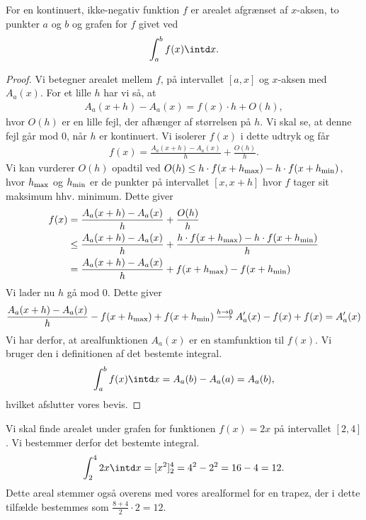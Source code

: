 \begin{setn}
For en kontinuert, ikke-negativ funktion $f$ er arealet afgrænset af $x$-aksen, to punkter $a$ og $b$ og grafen for $f$ givet ved
\begin{align*}
\int_a^bf(x)\intd x.
\end{align*} 
\end{setn}
\begin{proof}
Vi betegner arealet mellem $f$, på intervallet $[a,x]$ og $x$-aksen med $A_a(x)$. For et lille $h$ har vi så, at 
\begin{align*}
A_a(x+h)-A_a(x) = f(x)\cdot h + O(h), 
\end{align*}
hvor $O(h)$ er en lille fejl, der afhænger af størrelsen på $h$. Vi skal se, at denne fejl går mod $0$, når $h$ er kontinuert. Vi isolerer $f(x)$ i dette udtryk og får
\begin{align*}
f(x) = \frac{A_a(x+h)-A_a(x)}{h} + \frac{O(h)}{h}.
\end{align*}
Vi kan vurderer $O(h)$ opadtil ved $O(h) \leq h\cdot f(x+h_{\textnormal{max}})-h\cdot f(x+h_{\textnormal{min}})$, hvor $h_{\textnormal{max}}$ og $h_{\textnormal{min}}$ er de punkter på intervallet $[x,x+h]$ hvor $f$ tager sit maksimum hhv. minimum. Dette giver
\begin{align*}
f(x) &= \frac{A_a(x+h)-A_a(x)}{h} + \frac{O(h)}{h}\\
&\leq \frac{A_a(x+h)-A_a(x)}{h} + \frac{ h\cdot f(x+h_{\textnormal{max}})-h\cdot f(x+h_{\textnormal{min}})}{h}\\
&=\frac{A_a(x+h)-A_a(x)}{h} +   f(x+h_{\textnormal{max}})-f(x+h_{\textnormal{min}})
\end{align*}
Vi lader nu $h$ gå mod $0$. Dette giver 
\begin{align*}
\frac{A_a(x+h)-A_a(x)}{h} -   f(x+h_{\textnormal{max}})+f(x+h_{\textnormal{min}}) \overset{h\rightarrow 0}{\longrightarrow}A_a'(x) - f(x)+f(x) = A_a'(x)
\end{align*}
Vi har derfor, at arealfunktionen $A_a(x)$ er en stamfunktion til $f(x)$. Vi bruger den i definitionen af det bestemte integral.
\begin{align*}
\int_a^bf(x) \intd x = A_a(b)-A_a(a) = A_a(b),
\end{align*}
hvilket afslutter vores bevis.
\end{proof}

\begin{exa}
Vi skal finde arealet under grafen for funktionen $f(x) = 2x$ på intervallet $[2,4]$. Vi bestemmer derfor det bestemte integral.
\begin{align*}
\int_2^4 2x \intd x = [x^2]_2^4 = 4^2-2^2 = 16-4 = 12. 
\end{align*}
Dette areal stemmer også overens med vores arealformel for en trapez, der i dette tilfælde bestemmes som $\frac{8+4}{2}\cdot 2 = 12$. 
\end{exa}

